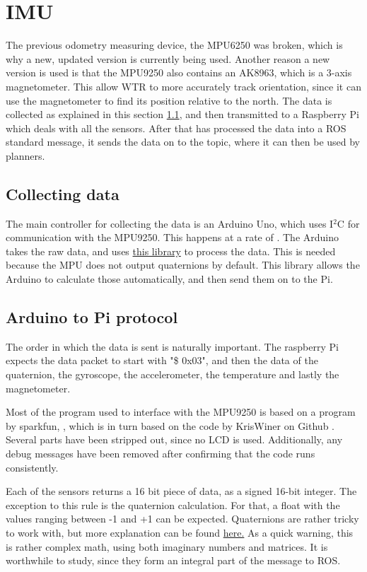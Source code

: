 \section{IMU}
The previous odometry measuring device, the MPU6250 \cite{mpu6250} was broken, which is why a new, updated version is currently being used.
Another reason a new version is used is that the MPU9250 \cite{MPU9250} also contains an AK8963, which is a 3-axis magnetometer.
This allow WTR to more accurately track orientation, since it can use the magnetometer to find its position relative to the north.
The data is collected as explained in this section \ref{sec::collect}, and then transmitted to a Raspberry Pi which deals with all the sensors.
After that has processed the data into a ROS standard message, it sends the data on to the topic, where it can then be used by planners.

\subsection{Collecting data} \label{sec::collect}
The main controller for collecting the data is an Arduino Uno, which uses I$^{2}$C for communication with the MPU9250.
This happens at a rate of .
The Arduino takes the raw data, and uses \href{https://github.com/sparkfun/SparkFun_MPU-9250_Breakout_Arduino_Library}{this library} to process the data.
This is needed because the MPU does not output quaternions by default.
This library allows the Arduino to calculate those automatically, and then send them on to the Pi.

\subsection{Arduino to Pi protocol}
The order in which the data is sent is naturally important.
The raspberry Pi expects the data packet to start with "\$ 0x03", and then the data of the quaternion, the gyroscope, the accelerometer, the temperature and lastly the magnetometer. 

Most of the program used to interface with the MPU9250 is based on a program by sparkfun, \cite{sparkfunMPU}, which is in turn based on the code by KrisWiner on Github \cite{kriswiner}.
Several parts have been stripped out, since no LCD is used.
Additionally, any debug messages have been removed after confirming that the code runs consistently.

Each of the sensors returns a 16 bit piece of data, as a signed 16-bit integer.
The exception to this rule is the quaternion calculation.
For that, a float with the values ranging between -1 and +1 can be expected.
Quaternions are rather tricky to work with, but more explanation can be found \href{https://www.3dgep.com/understanding-quaternions/#The_Complex_Plane}{here.}
As a quick warning, this is rather complex math, using both imaginary numbers and matrices.
It is worthwhile to study, since they form an integral part of the message to ROS.

